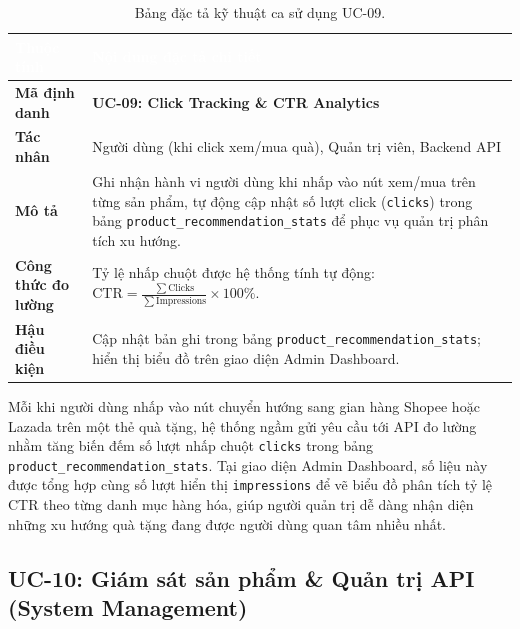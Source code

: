 \begin{table}[htbp]
\centering
\caption{Bảng đặc tả kỹ thuật ca sử dụng UC-09.}
\label{tab:spec_uc09}
\small
\renewcommand{\arraystretch}{1.2}
\begin{tabularx}{\textwidth}{|p{3.2cm}|X|}
\hline
\rowcolor{PrimaryBlue}
\textcolor{white}{\textbf{Thuộc tính}} & \textcolor{white}{\textbf{Nội dung đặc tả chi tiết}} \\
\hline
\textbf{Mã định danh} & \textbf{UC-09: Click Tracking \& CTR Analytics} \\
\hline
\textbf{Tác nhân} & Người dùng (khi click xem/mua quà), Quản trị viên, Backend API \\
\hline
\textbf{Mô tả} & Ghi nhận hành vi người dùng khi nhấp vào nút xem/mua trên từng sản phẩm, tự động cập nhật số lượt click (\texttt{clicks}) trong bảng \texttt{product\_recommendation\_stats} để phục vụ quản trị phân tích xu hướng. \\
\hline
\textbf{Công thức đo lường} & Tỷ lệ nhấp chuột được hệ thống tính tự động:
$\mathrm{CTR} = \frac{\sum \mathrm{Clicks}}{\sum \mathrm{Impressions}} \times 100\%$. \\
\hline
\textbf{Hậu điều kiện} & Cập nhật bản ghi trong bảng \texttt{product\_recommendation\_stats}; hiển thị biểu đồ trên giao diện Admin Dashboard. \\
\hline
\end{tabularx}
\end{table}

Mỗi khi người dùng nhấp vào nút chuyển hướng sang gian hàng Shopee hoặc Lazada trên một thẻ quà tặng, hệ thống ngầm gửi yêu cầu tới API đo lường nhằm tăng biến đếm số lượt nhấp chuột \texttt{clicks} trong bảng \texttt{product\_recommendation\_stats}. Tại giao diện Admin Dashboard, số liệu này được tổng hợp cùng số lượt hiển thị \texttt{impressions} để vẽ biểu đồ phân tích tỷ lệ CTR theo từng danh mục hàng hóa, giúp người quản trị dễ dàng nhận diện những xu hướng quà tặng đang được người dùng quan tâm nhiều nhất.

\subsection{UC-10: Giám sát sản phẩm \& Quản trị API (System Management)}

